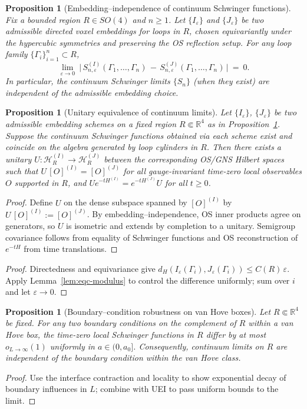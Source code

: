 \documentclass[11pt]{amsart}
\theoremstyle{plain}
\newtheorem{proposition}[theorem]{Proposition}
\theoremstyle{definition}
\theoremstyle{remark}
\begin{document}
\begin{proposition}[Embedding–independence of continuum Schwinger functions]\label{prop:embedding-independence}
Fix a bounded region $R\in SO(4)$ and $n\ge 1$. Let $\{I_\varepsilon\}$ and $\{J_\varepsilon\}$ be two admissible directed voxel embeddings for loops in $R$, chosen equivariantly under the hypercubic symmetries and preserving the OS reflection setup. For any loop family $\{\Gamma_i\}_{i=1}^n\subset R$,
\[
  \lim_{\varepsilon\to 0}\ \Big|\, S_{n,\varepsilon}^{(I)}(\Gamma_1,\dots,\Gamma_n)\,-\,S_{n,\varepsilon}^{(J)}(\Gamma_1,\dots,\Gamma_n)\,\Big|\ =\ 0.
\]
In particular, the continuum Schwinger limits $\{S_n\}$ (when they exist) are independent of the admissible embedding choice.
\end{proposition}
\begin{proposition}[Unitary equivalence of continuum limits]\label{prop:unitary-equivalence}
Let $\{I_\varepsilon\}$, $\{J_\varepsilon\}$ be two admissible embedding schemes on a fixed region $R\Subset\mathbb R^4$ as in Proposition~\ref{prop:embedding-independence}. Suppose the continuum Schwinger functions obtained via each scheme exist and coincide on the algebra generated by loop cylinders in $R$. Then there exists a unitary $U: \mathcal H^{(I)}_R \to \mathcal H^{(J)}_R$ between the corresponding OS/GNS Hilbert spaces such that $U\,[O]^{(I)} = [O]^{(J)}$ for all gauge-invariant time-zero local observables $O$ supported in $R$, and $U e^{-tH^{(I)}} = e^{-tH^{(J)}} U$ for all $t\ge 0$.
\end{proposition}
\begin{proof}
Define $U$ on the dense subspace spanned by $[O]^{(I)}$ by $U\,[O]^{(I)} := [O]^{(J)}$. By embedding–independence, OS inner products agree on generators, so $U$ is isometric and extends by completion to a unitary. Semigroup covariance follows from equality of Schwinger functions and OS reconstruction of $e^{-tH}$ from time translations.
\end{proof}
\begin{proof}
Directedness and equivariance give $d_H(I_\varepsilon(\Gamma_i),J_\varepsilon(\Gamma_i))\le C(R)\,\varepsilon$. Apply Lemma~\ref{lem:eqc-modulus} to control the difference uniformly; sum over $i$ and let $\varepsilon\to 0$.
\end{proof}

\begin{proposition}[Boundary–condition robustness on van Hove boxes]\label{prop:bc-robust}
Let $R\Subset\mathbb R^4$ be fixed. For any two boundary conditions on the complement of $R$ within a van Hove box, the time-zero local Schwinger functions in $R$ differ by at most $o_{L\to\infty}(1)$ uniformly in $a\in(0,a_0]$. Consequently, continuum limits on $R$ are independent of the boundary condition within the van Hove class.
\end{proposition}
\begin{proof}
Use the interface contraction and locality to show exponential decay of boundary influences in $L$; combine with UEI to pass uniform bounds to the limit.
\end{proof}
\end{document}
